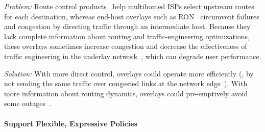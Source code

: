 \vspace{0.05in}
\noindent
{\em Problem:} 
Route control products~\cite{www-routescience,www-sockeye}
help multihomed ISPs select upstream routes for each destination,
whereas end-host overlays such as RON~\cite{Andersen01} circumvent
failures and congestion by directing traffic through an intermediate
host.
Because they lack complete information about routing and
traffic-engineering optimizations, these overlays sometimes increase
congestion and decrease the effectiveness of traffic engineering in the
underlay network~\cite{Qiu2003}, which can degrade user performance.

\vspace{0.05in}
\noindent
{\em Solution:} 
With more direct control, overlays could operate more efficiently (\eg,
by not sending the same traffic over congested links at the network
edge~\cite{Jannotti2002}).  With more information about routing
dynamics, overlays could
pre-emptively avoid some outages~\cite{Feamster2003}. 









\paragraph{Support Flexible, Expressive Policies}


